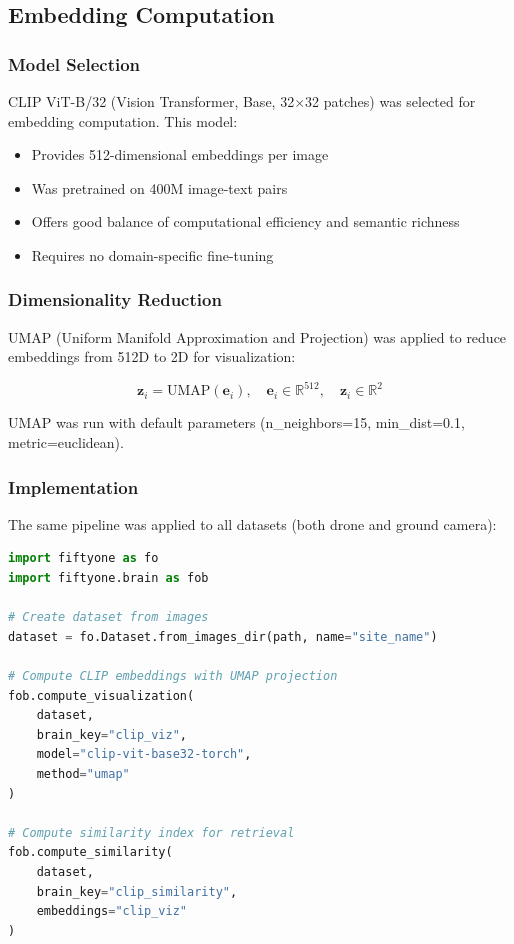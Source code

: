 \subsection{Embedding Computation}

\subsubsection{Model Selection}
CLIP ViT-B/32 (Vision Transformer, Base, 32$\times$32 patches) was selected for embedding computation. This model:
\begin{itemize}
    \item Provides 512-dimensional embeddings per image
    \item Was pretrained on 400M image-text pairs
    \item Offers good balance of computational efficiency and semantic richness
    \item Requires no domain-specific fine-tuning
\end{itemize}

\subsubsection{Dimensionality Reduction}
UMAP (Uniform Manifold Approximation and Projection) was applied to reduce embeddings from 512D to 2D for visualization:

\begin{equation}
    \mathbf{z}_i = \text{UMAP}(\mathbf{e}_i), \quad \mathbf{e}_i \in \mathbb{R}^{512}, \quad \mathbf{z}_i \in \mathbb{R}^{2}
\end{equation}

UMAP was run with default parameters (n\_neighbors=15, min\_dist=0.1, metric=euclidean).

\subsubsection{Implementation}

The same pipeline was applied to all datasets (both drone and ground camera):

\begin{lstlisting}[language=Python, caption=Embedding computation pipeline]
import fiftyone as fo
import fiftyone.brain as fob

# Create dataset from images
dataset = fo.Dataset.from_images_dir(path, name="site_name")

# Compute CLIP embeddings with UMAP projection
fob.compute_visualization(
    dataset,
    brain_key="clip_viz",
    model="clip-vit-base32-torch",
    method="umap"
)

# Compute similarity index for retrieval
fob.compute_similarity(
    dataset,
    brain_key="clip_similarity",
    embeddings="clip_viz"
)
\end{lstlisting}

